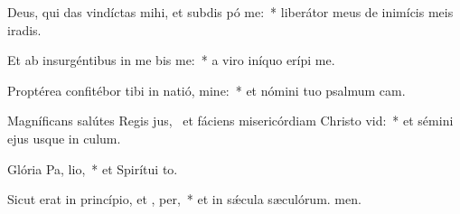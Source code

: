 \item Deus, qui das vindíctas mihi, et subdis pó  me:~* liberátor meus de inimícis meis iradis.
\item Et ab insurgéntibus in me bis me:~* a viro iníquo erípi me.
\item Proptérea confitébor tibi in natió, mine:~* et nómini tuo psalmum cam.
\item Magníficans salútes Regis jus,~\pscross{} et fáciens misericórdiam Christo  vid:~* et sémini ejus usque in culum.
\item Glória Pa,  lio,~* et Spirítui to.
\item Sicut erat in princípio, et ,  per,~* et in sǽcula sæculórum. men.
